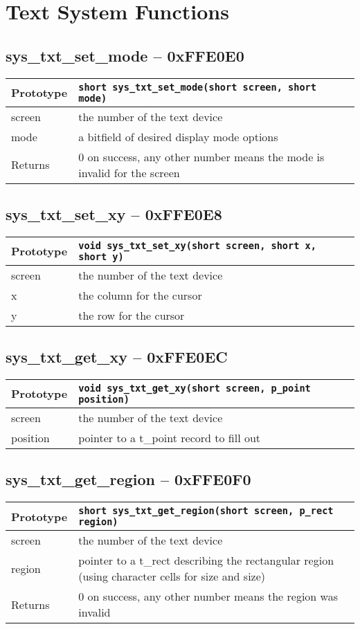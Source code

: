 \section{Text System Functions}

\subsection*{sys\_txt\_set\_mode -- 0xFFE0E0}
\begin{tabular}{|l||l|} \hline
Prototype & \lstinline!short sys_txt_set_mode(short screen, short mode)! \\ \hline
screen & the number of the text device \\ \hline
mode & a bitfield of desired display mode options \\ \hline
Returns & 0 on success, any other number means the mode is invalid for the screen \\ \hline
\end{tabular}

\subsection*{sys\_txt\_set\_xy -- 0xFFE0E8}
\begin{tabular}{|l||l|} \hline
Prototype & \lstinline!void sys_txt_set_xy(short screen, short x, short y)! \\ \hline
screen & the number of the text device \\ \hline
x & the column for the cursor \\ \hline
y & the row for the cursor \\ \hline
\end{tabular}

\subsection*{sys\_txt\_get\_xy -- 0xFFE0EC}
\begin{tabular}{|l||l|} \hline
Prototype & \lstinline!void sys_txt_get_xy(short screen, p_point position)! \\ \hline
screen & the number of the text device \\ \hline
position & pointer to a t\_point record to fill out \\ \hline
\end{tabular}

\subsection*{sys\_txt\_get\_region -- 0xFFE0F0}
\begin{tabular}{|l||l|} \hline
Prototype & \lstinline!short sys_txt_get_region(short screen, p_rect region)! \\ \hline
screen & the number of the text device \\ \hline
region & pointer to a t\_rect describing the rectangular region (using character cells for size and size) \\ \hline
Returns & 0 on success, any other number means the region was invalid \\ \hline
\end{tabular}

